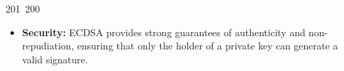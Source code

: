 201~200~\documentclass{article}
\begin{document}
	                                                                                                                                                                                                                                                                                                	                                                                                                                                        	    	                                                                                                	                                                                                                                                                                                                                                                                                                                                	                                                                        	                                                                        	                                                                                                                                        	                                                                                                                                                                                                                        	                                                                    \begin{itemize}
	                                                                                                                                                                                                                                                                                                	                                                                                                                                        	    	                                                                                                	                                                                                                                                                                                                                                                                                                                                	                                                                        	                                                                        	                                                                                                                                        	                                                                                                                                                                                                                        	                                                                        \item \textbf{Security:} ECDSA provides strong guarantees of authenticity and non-repudiation, ensuring that only the holder of a private key can generate a valid signature.

\end{itemize}
\end{document}
